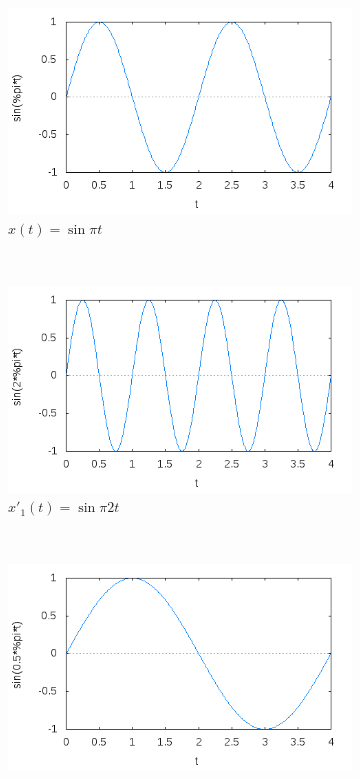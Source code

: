 \begin{enumerate}
\begin{figure}[!h]
\centering
\begin{subfigure}[b]{0.4\textwidth}
\includegraphics[width=\textwidth]{pict/timescaling1}
\caption{$x(t)=\sin \pi t$}
\end{subfigure}%
        ~ %
\begin{subfigure}[b]{0.4\textwidth}
\includegraphics[width=\textwidth]{pict/timescaling2}
\caption{$x'_1(t)=\sin \pi 2t$}
\end{subfigure}
        ~ %
\begin{subfigure}[b]{0.4\textwidth}
\includegraphics[width=\textwidth]{pict/timescaling3}

\end{subfigure}
\end{figure}
\end{enumerate}
